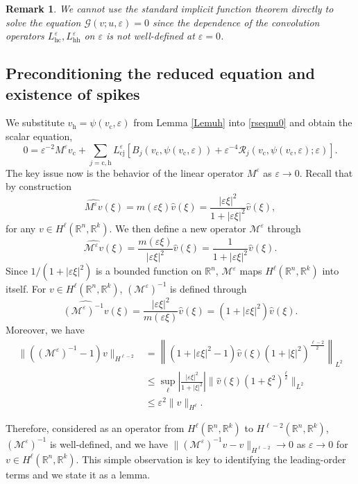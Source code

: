 \documentclass[10pt]{article}
\newtheorem{Remark}[Lemma]{Remark}
\newcommand{\R}{\mathbb{R}}
\newcommand{\eps}{\varepsilon}
\newcommand{\G}{\mathcal{G}}
\newcommand{\M}{\mathcal{M}}
\newcommand{\Rm}{\mathcal{R}}
\begin{document}
\begin{Remark} We cannot use the standard implicit function theorem directly to solve the equation $\G(v;u,\eps) = 0$ since the dependence of the convolution operators $L_\mathrm{hc}^\eps, L_\mathrm{hh}^\eps$ on $\eps$ is not well-defined at $\eps = 0$. 
\end{Remark}



\subsection{Preconditioning the reduced  equation and existence of spikes}\label{s:3.2}



We substitute $v_\mathrm{h} = \psi(v_\mathrm{c},\eps)$ from Lemma \ref{Lemuh} into  \eqref{rseqnu0} and obtain the scalar equation,
\begin{equation} \label{1dnl}
0 = \eps^{-2}M^\eps v_\mathrm{c} + \sum_{j=\mathrm{c,h}}L_\mathrm{cj}^\eps\left[B_j(v_\mathrm{c},\psi(v_\mathrm{c},\eps))+\eps^{-4}\Rm_j(v_\mathrm{c},\psi(v_\mathrm{c},\eps);\eps)\right].
\end{equation}
The key issue now is the behavior of the linear operator $M^\eps$ as $\eps \to 0$. Recall that by construction
\[
\widehat{M^\eps v}(\xi) = m(\eps \xi)\widehat{v}(\xi) = \frac{|\eps\xi|^2}{1+|\eps\xi|^2} \widehat{v}(\xi), 
\]
for any $v\in H^\ell(\R^n,\R^k)$. We then define a new operator $\mathcal{M}^\eps$ through 
\[ 
\widehat{\mathcal{M}^\eps v}(\xi) = \frac{m(\eps\xi)}{|\eps\xi|^2}\widehat{v}(\xi)=\frac{1}{1+|\eps\xi|^2} \widehat{v}(\xi). 
\] 
Since $1/(1+|\eps \xi|^2)$ is a bounded function on $\R^n$, $\M^\eps$ maps $H^\ell(\R^n,\R^k)$ into itself. 
For $v\in H^\ell(\R^n,\R^k)$, $(\M^{\eps})^{-1}$ is defined through
\[
\widehat{(\M^{\eps})^{-1}v} (\xi) = \frac{|\eps\xi|^2}{m(\eps\xi)} \widehat{v}(\xi)= (1+|\eps \xi|^2)\widehat{v}(\xi).
\]
Moreover, we have
\begin{align*}
\|((\M^\eps)^{-1}-1)v\|_{H^{\ell-2}} &=\left\| \left(1+|\eps\xi|^2-1\right)\widehat{v}(\xi)(1+|\xi|^2)^{\frac{\ell-2}{2}}\right\|_{L^2} 
\\
& \le \sup_{\ell} \left|\frac{|\eps\xi|^2}{1+|\xi|^2}\right| \|\widehat{v}(\xi)(1+\xi^2)^{\frac{\ell}{2}} \|_{L^{2}}\\ 
&\le \eps^2 \|v\|_{H^\ell}.
\end{align*}

Therefore, considered as an operator from $H^\ell (\R^n,\R^k)$ to $H^{\ell-2}(\R^n,\R^k)$, $(\M^\eps)^{-1}$ is well-defined, and we have $\|(\M^{\eps})^{-1}v - v\|_{H^{\ell-2}} \to 0$ as $\eps \to 0$ for $v \in H^\ell (\R^n,\R^k)$. This simple observation is key to identifying the leading-order terms and  we state it as a lemma.
\end{document}
